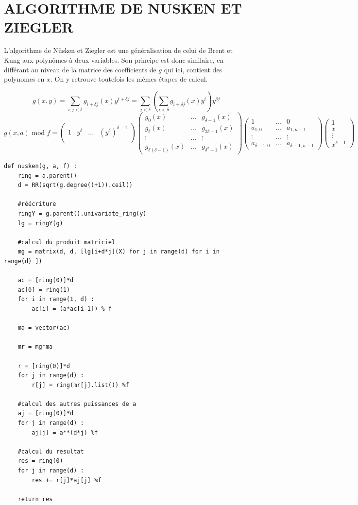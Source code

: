 \documentclass[a4paper]{article}
\begin{document}
\section{ALGORITHME DE NUSKEN ET ZIEGLER}

L'algorithme de Nüsken et Ziegler est une généralisation de celui de Brent et Kung aux polynômes à deux variables. 
Son principe est donc similaire, en différant au niveau de la matrice des coefficients de $g$ qui ici, contient des polynomes en $x$.
On y retrouve toutefois les mêmes étapes de calcul.

\[
g(x,y) = \sum_{i,j<\delta}g_{i+\delta j}(x)y^{i+\delta j} = \sum_{j<\delta} \left( \sum_{i<\delta} g_{i+\delta j}(x)y^i \right) y^{\delta j}     
\]
\[
g(x, a)\text{ mod }f =
\begin{pmatrix}
    1 & y^\delta & ... & (y^\delta)^{\delta-1}  \\  
\end{pmatrix}
\begin{pmatrix}
    g_0(x) & ... & g_{\delta-1}(x) \\
    g_{\delta}(x) & ... & g_{2\delta-1}(x) \\
    \vdots & ... & \vdots \\
    g_{\delta(\delta-1)}(x) & ... & g_{\delta^2-1}(x)
\end{pmatrix}
\begin{pmatrix}
    1 &  ... & 0 \\
    a_{1,0} & ... & a_{1,n-1} \\
    \vdots &  ... & \vdots \\
    a_{\delta-1,0} & ... & a_{\delta-1,n-1}
\end{pmatrix}
\begin{pmatrix}
    1 \\
    x \\
    \vdots \\
    x^{\delta-1}
\end{pmatrix}
\]

\begin{lstlisting}[title={nusken et ziegler}]
def nusken(g, a, f) :
    ring = a.parent()
    d = RR(sqrt(g.degree()+1)).ceil()

    #réécriture
    ringY = g.parent().univariate_ring(y)
    lg = ringY(g)

    #calcul du produit matriciel
    mg = matrix(d, d, [lg[i+d*j](X) for j in range(d) for i in range(d) ])

    ac = [ring(0)]*d
    ac[0] = ring(1)
    for i in range(1, d) :
        ac[i] = (a*ac[i-1]) % f

    ma = vector(ac)
    
    mr = mg*ma

    r = [ring(0)]*d
    for j in range(d) :
        r[j] = ring(mr[j].list()) %f
    
    #calcul des autres puissances de a
    aj = [ring(0)]*d
    for j in range(d) :
        aj[j] = a**(d*j) %f

    #calcul du resultat
    res = ring(0)
    for j in range(d) :
        res += r[j]*aj[j] %f

    return res

\end{lstlisting}
\end{document}
